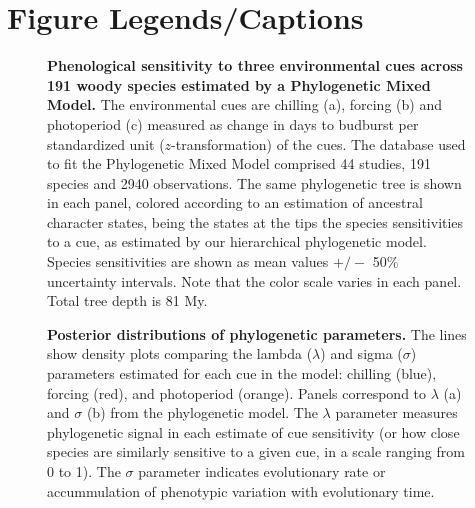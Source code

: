 \documentclass{article}
\begin{document}
\section*{Figure Legends/Captions} 


\begin{figure} 
  \begin{center}
  \caption{\textbf{Phenological sensitivity to three environmental cues across 191 woody species estimated by a Phylogenetic Mixed Model.} The environmental cues are chilling (a), forcing (b) and photoperiod (c) measured as change in days to budburst per standardized unit ($z$-transformation) of the cues. The database used to fit the Phylogenetic Mixed Model comprised 44 studies, 191 species and 2940 observations. The same phylogenetic tree is shown in each panel, colored according to an estimation of ancestral character states, being the states at the tips the species sensitivities to a cue, as estimated by our hierarchical phylogenetic model. Species sensitivities are shown as mean values $+/-$ 50\% uncertainty intervals. Note that the color scale varies in each panel. Total tree depth is 81 My.}
  \label{fig:muplot_all}
  \end{center}
\end{figure}


\begin{figure} 
  \begin{center}
  \caption{\textbf{Posterior distributions of phylogenetic parameters.} The lines show density plots comparing the lambda ($\lambda$) and sigma ($\sigma$) parameters estimated for each cue in the model: chilling (blue), forcing (red), and photoperiod (orange). Panels correspond to $\lambda$ (a) and $\sigma$ (b) from the phylogenetic model. The $\lambda$ parameter measures phylogenetic signal in each estimate of cue sensitivity (or how close species are similarly sensitive to a given cue, in a scale ranging from 0 to 1). The $\sigma$ parameter indicates evolutionary rate or accummulation of phenotypic variation with evolutionary time.}
  \label{fig:phylosig_all}
  \end{center}
\end{figure}
\end{document}
